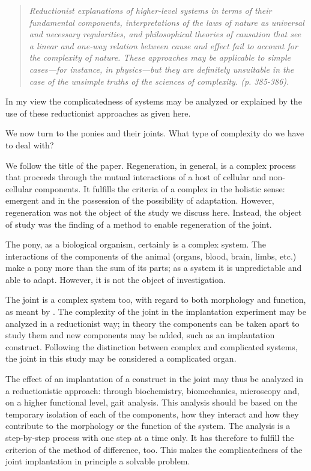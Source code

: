 \documentclass[twocolumn, reflection, authordate,  issue]{jote-new-article}
\begin{document}
\begin{quote}\emph{
Reductionist explanations of higher-level systems in terms of their fundamental components, interpretations of the laws of nature as universal and necessary regularities, and philosophical theories of causation that see a linear and one-way relation between cause and effect fail to account for the complexity of nature. These approaches may be applicable to simple cases---for instance, in physics---but they are definitely unsuitable in the case of the unsimple truths of the sciences of complexity. (p. 385-386).} \end{quote}
\balance
In my view the complicatedness of systems may be analyzed or explained by the use of these reductionist approaches as given here.

We now turn to the ponies and their joints. What type of complexity do we have to deal with?

We follow the title of the paper. Regeneration, in general, is a complex process that proceeds through the mutual interactions of a host of cellular and non-cellular components. It fulfills the criteria of a complex in the holistic sense: emergent and in the possession of the possibility of adaptation. However, regeneration was not the object of the study we discuss here. Instead, the object of study was the finding of a method to enable regeneration of the joint.

The pony, as a biological organism, certainly is a complex system. The interactions of the components of the animal (organs, blood, brain, limbs, etc.) make a pony more than the sum of its parts; as a system it is unpredictable and able to adapt. However, it is not the object of investigation.

The joint is a complex system too, with regard to both morphology and function, as meant by \textcite{McShea1996}. The complexity of the joint in the implantation experiment may be analyzed in a reductionist way; in theory the components can be taken apart to study them and new components may be added, such as an implantation construct. Following the distinction between complex and complicated systems, the joint in this study may be considered a complicated organ.

The effect of an implantation of a construct in the joint may thus be analyzed in a reductionistic approach: through biochemistry, biomechanics, microscopy and, on a higher functional level, gait analysis. This analysis should be based on the temporary isolation of each of the components, how they interact and how they contribute to the morphology or the function of the system. The analysis is a step-by-step process with one step at a time only. It has therefore to fulfill the criterion of the method of difference, too. This makes the complicatedness of the joint implantation in principle a solvable problem.
\end{document}
